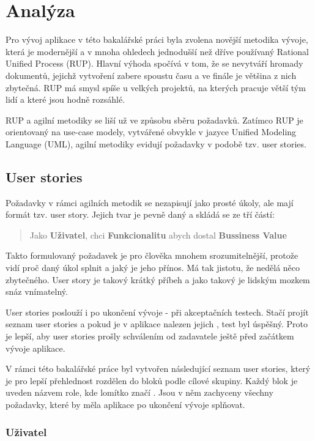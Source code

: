 \chapter{Analýza}

Pro vývoj aplikace v této bakalářské práci byla zvolena novější metodika vývoje, která je modernější a v mnoha ohledech jednodušší než dříve používaný Rational Unified Process (RUP)\cite{rup}. Hlavní výhoda spočívá v tom, že se nevytváří hromady dokumentů, jejichž vytvoření zabere spoustu času a ve finále je většina z nich zbytečná. RUP má smysl spíše u velkých projektů, na kterých pracuje větší tým lidí a které jsou hodně rozsáhlé. 

RUP a agilní metodiky se liší už ve způsobu sběru požadavků. Zatímco RUP je orientovaný na use-case modely, vytvářené obvykle v jazyce Unified Modeling Language (UML)\cite{uml}, agilní metodiky evidují požadavky v podobě tzv. user stories\cite{userstory}.

\section{User stories}

Požadavky v rámci agilních metodik se nezapisují jako prosté úkoly, ale mají formát tzv. user story. Jejich tvar je pevně daný a skládá se ze tří částí:
\begin{quote}
Jako \textbf{Uživatel}, chci \textbf{Funkcionalitu} abych dostal \textbf{Bussiness Value}
\end{quote}

Takto formulovaný požadavek je pro člověka mnohem srozumitelnější, protože vidí proč daný úkol splnit a jaký je jeho přínos. Má tak jistotu, že nedělá něco zbytečného. User story je takový krátký příbeh a jako takový je lidským mozkem snáz vnímatelný.

User stories poslouží i po ukončení vývoje - při akceptačních testech. Stačí projít seznam user stories a pokud je v aplikace nalezen jejich , test byl úspěšný. Proto je lepší, aby user stories prošly schválením od zadavatele ještě před začátkem vývoje aplikace.

V rámci této bakalářské práce byl vytvořen následující seznam user stories, který je pro lepší přehlednost rozdělen do bloků podle cílové skupiny. Každý blok je uveden názvem role, kde lomítko značí . Jsou v něm zachyceny všechny požadavky, které by měla aplikace po ukončení vývoje splňovat.

\subsection{Uživatel}

